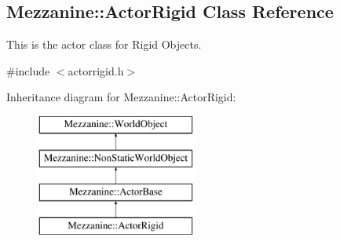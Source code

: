 \hypertarget{classMezzanine_1_1ActorRigid}{
\subsection{Mezzanine::ActorRigid Class Reference}
\label{classMezzanine_1_1ActorRigid}
}


This is the actor class for Rigid Objects.  




{\ttfamily \#include $<$actorrigid.h$>$}

Inheritance diagram for Mezzanine::ActorRigid:\begin{figure}[H]
\begin{center}
\leavevmode
\includegraphics[height=4.000000cm]{classMezzanine_1_1ActorRigid}
\end{center}
\end{figure}
